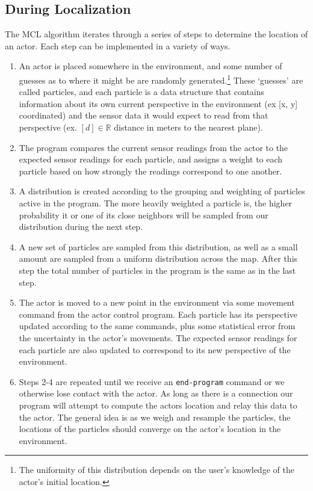 \documentclass[a4paper,11pt]{article}
\begin{document}
\subsection{During Localization}
  The MCL algorithm iterates through a series of steps to determine the location of an actor. Each step can be implemented in a variety of ways.
  \begin{enumerate}
  \item An actor is placed somewhere in the environment, and some number of guesses as to where it might be are randomly generated.\footnote{The uniformity of this distribution depends on the user's knowledge of the actor's initial location.} These `guesses' are called particles, and each particle is a data structure that contains information about its own current perspective in the environment (ex [x, y] coordinated) and the sensor data it would expect to read from that perspective (ex. $[d] \in \mathbb{R}$ distance in meters to the nearest plane).
  \item The program compares the current sensor readings from the actor to the expected sensor readings for each particle, and assigns a weight to each particle based on how strongly the readings correspond to one another.
  \item A distribution is created according to the grouping and weighting of particles active in the program. The more heavily weighted a particle is, the higher probability it or one of its close neighbors will be sampled from our distribution during the next step.
  \item A new set of particles are sampled from this distribution, as well as a small amount are sampled from a uniform distribution across the map. After this step the total number of particles in the program is the same as in the last step.
  \item The actor is moved to a new point in the environment via some movement command from the actor control program. Each particle has its perspective updated according to the same commands, plus some statistical error from the uncertainty in the actor's movements. The expected sensor readings for each particle are also updated to correspond to its new perspective of the environment.
  \item Steps 2-4 are repeated until we receive an \texttt{end-program} command or we otherwise lose contact with the actor. As long as there is a connection our program will attempt to compute the actors location and relay this data to the actor. The general idea is as we weigh and resample the particles, the locations of the particles should converge on the actor's location in the environment.
  \end{enumerate} 
\end{document}

